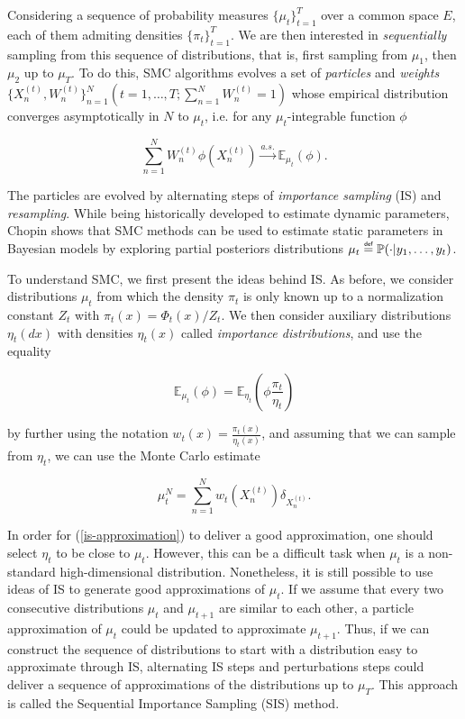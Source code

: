 \documentclass{article}
\newcommand\defeq{\mathrel{\overset{\makebox[0pt]{\mbox{\normalfont\tiny\sffamily def}}}{=}}}
\begin{document}
Considering a sequence of probability measures $\{\mu_t\}_{t=1}^T$ over a common space $E$, each of them admiting densities $\{\pi_t\}_{t=1}^T$. We are then interested in \textit{sequentially} sampling from this sequence of distributions, that is, first sampling from $\mu_1$, then $\mu_2$ up to $\mu_T$. To do this, SMC algorithms evolves a set of \textit{particles} and \textit{weights} $\{X_n^{(t)}, W_n^{(t)}\}_{n=1}^N (t = 1,\ldots ,T; \sum_{n=1}^N W_n^{(t)} = 1)$ whose empirical distribution converges asymptotically in $N$ to $\mu_t$, i.e. for any $\mu_t$-integrable function $\phi$

\begin{equation}
  \sum_{n=1}^N W_n^{(t)}\phi(X_n^{(t)}) \xrightarrow[]{a.s.} \mathbb{E}_{\mu_t}(\phi).
\end{equation}

The particles are evolved by alternating steps of \textit{importance sampling} (IS) and \textit{resampling}. While being historically developed to estimate dynamic parameters, Chopin \cite{chopin_2002} shows that SMC methods can be used to estimate static parameters in Bayesian models by exploring partial posteriors distributions $\mu_t \defeq \mathbb{P}(\cdot \lvert y_1, \ldots, y_t)$.

To understand SMC, we first present the ideas behind IS. As before, we consider distributions $\mu_t$ from which the density $\pi_t$ is only known up to a normalization constant $Z_t$ with $\pi_t(x) = \Phi_t(x) / Z_t$. We then consider auxiliary distributions $\eta_t(dx)$ with densities $\eta_t(x)$ called \textit{importance distributions}, and use the equality

\begin{equation}
  \mathbb{E}_{\mu_t}(\phi) = \mathbb{E}_{\eta_t}(\phi \frac{\pi_t}{\eta_t})
\end{equation}

by further using the notation $w_t(x) = \frac{\pi_t(x)}{\eta_t(x)}$, and assuming that we can sample from $\eta_t$, we can use the Monte Carlo estimate

\begin{equation}
  \label{is-approximation}
  \mu_t^N = \sum_{n=1}^N w_t(X_n^{(t)}) \delta_{X_n^{(t)}}.
\end{equation}

In order for (\ref{is-approximation}) to deliver a good approximation, one should select $\eta_t$ to be close to $\mu_t$. However, this can be a difficult task when $\mu_t$ is a non-standard high-dimensional distribution. Nonetheless, it is still possible to use ideas of IS to generate good approximations of $\mu_t$. If we assume that every two consecutive distributions $\mu_t$ and $\mu_{t+1}$ are similar to each other, a particle approximation of $\mu_t$ could be updated to approximate $\mu_{t+1}$. Thus, if we can construct the sequence of distributions to start with a distribution easy to approximate through IS, alternating IS steps and perturbations steps could deliver a sequence of approximations of the distributions up to $\mu_T$. This approach is called the Sequential Importance Sampling (SIS) method.
\end{document}
